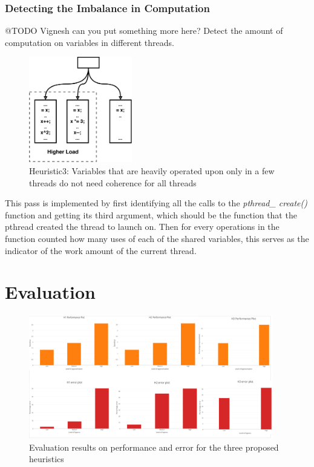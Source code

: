 \documentclass[12pt,conference]{IEEEtran}
\begin{document}
\subsubsection{Detecting the Imbalance in Computation}
@TODO Vignesh can you put something more here?
Detect the amount of computation on variables in different threads.
\begin{figure}[h]
    \centering
    \includegraphics[width=0.40\textwidth]{Heuristic3.pdf}
    \caption{Heuristic3: Variables that are heavily operated upon only in a few threads do not need coherence for all threads}
    \label{fig:h3}
\end{figure}

This pass is implemented by first identifying all the calls to the 
\textit{pthread\_ create()} function and getting its third argument, which should
be the function that the pthread created the thread to launch on. Then for every
operations in the function counted how many uses of each of the shared 
variables, this serves as the indicator of the work amount of the current thread.



\section{Evaluation}

\begin{figure}[h]
    \centering
    \includegraphics[width=0.95\textwidth]{result.png}
    \caption{Evaluation results on performance and error for the three proposed heuristics}
    \label{fig:result}
\end{figure}
\end{document}
